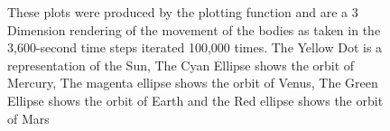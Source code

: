 \begin{figure}[]
        \caption{These plots were produced by the plotting function and are a 3 Dimension rendering of the movement of the bodies as taken in the 3,600-second time steps iterated 100,000 times. The Yellow Dot is a representation of the Sun, The Cyan Ellipse shows the orbit of Mercury, The magenta ellipse shows the orbit of Venus, The Green Ellipse shows the orbit of Earth and the Red ellipse shows the orbit of Mars}
        \label{plot:orbits}
     \end{figure}